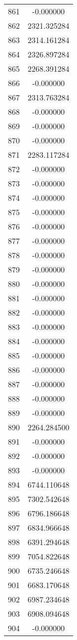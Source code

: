 \documentclass[12pt]{article}
\begin{document}
\begin{longtable}{@{}cc@{}}
861 & -0.000000 \\
862 & 2321.325284 \\
863 & 2314.161284 \\
864 & 2326.897284 \\
865 & 2268.391284 \\
866 & -0.000000 \\
867 & 2313.763284 \\
868 & -0.000000 \\
869 & -0.000000 \\
870 & -0.000000 \\
871 & 2283.117284 \\
872 & -0.000000 \\
873 & -0.000000 \\
874 & -0.000000 \\
875 & -0.000000 \\
876 & -0.000000 \\
877 & -0.000000 \\
878 & -0.000000 \\
879 & -0.000000 \\
880 & -0.000000 \\
881 & -0.000000 \\
882 & -0.000000 \\
883 & -0.000000 \\
884 & -0.000000 \\
885 & -0.000000 \\
886 & -0.000000 \\
887 & -0.000000 \\
888 & -0.000000 \\
889 & -0.000000 \\
890 & 2264.284500 \\
891 & -0.000000 \\
892 & -0.000000 \\
893 & -0.000000 \\
894 & 6744.110648 \\
895 & 7302.542648 \\
896 & 6796.186648 \\
897 & 6834.966648 \\
898 & 6391.294648 \\
899 & 7054.822648 \\
900 & 6735.246648 \\
901 & 6683.170648 \\
902 & 6987.234648 \\
903 & 6908.094648 \\
904 & -0.000000 \\

\end{longtable}
\end{document}
